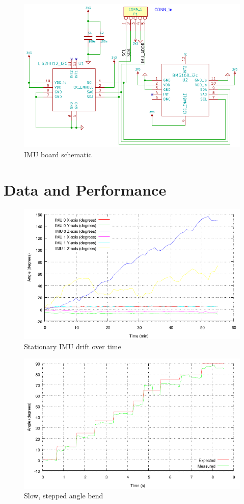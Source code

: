 \documentclass[a4paper, 12pt]{article}
\begin{document}
\begin{figure}[H]
    \centering
    \includegraphics{imu_schematic.pdf}
    \caption{IMU board schematic}
    \label{fig:pic6}
\end{figure}


\section*{Data and Performance}

\begin{figure}[H]
    \centering
    \includegraphics[scale=1.15]{drift.pdf}
    \caption{Stationary IMU drift over time}
    \label{fig:pic7}
\end{figure}

\begin{figure}[H]
    \centering
    \includegraphics[scale=1.15]{stepped.pdf}
    \caption{Slow, stepped angle bend}
    \label{fig:pic8}
\end{figure}
\end{document}
